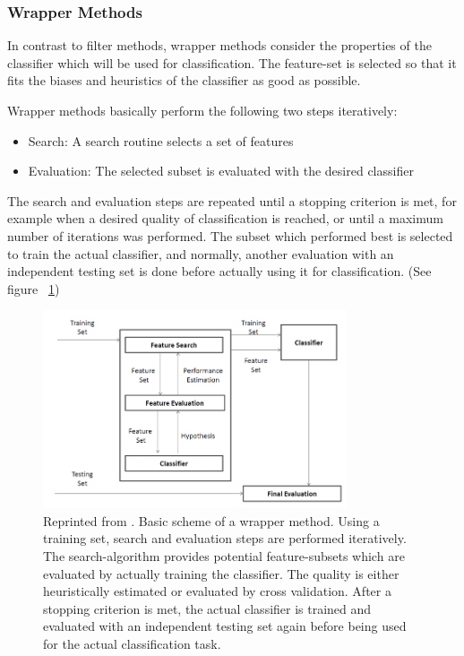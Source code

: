 \subsubsection{Wrapper Methods}
\label{sec:methods.flat.wrapper}


In contrast to filter methods, wrapper methods consider the properties of the classifier which will be used for classification.
The feature-set is selected so that it fits the biases and heuristics of the classifier as good as possible. 

Wrapper methods basically perform the following two steps iteratively: 

\begin{itemize}
  \item Search: A search routine selects a set of features 
  \item Evaluation: The selected subset is evaluated with the desired classifier
\end{itemize}

The search and evaluation steps are repeated until a stopping criterion is met, for example when a desired quality of classification is reached, 
or until a maximum number of iterations was performed. The subset which performed best is selected to train the actual classifier,
and normally, another evaluation with an independent testing set is done before actually using it for classification.
(See figure ~\ref{fig:methods.flat.wrapper.diagramm}) 

\begin{figure}[!ht]
  \centering 
  \includegraphics[width=0.8\textwidth]{chapters/methods/flat/wrapper_diagramm}
  \caption{Reprinted from \cite{Tang:04}. Basic scheme of a wrapper method. Using a training set, search and evaluation steps are performed iteratively.
	The search-algorithm provides potential feature-subsets which are evaluated by actually training the classifier. The quality is either heuristically estimated
	or evaluated by cross validation. After a stopping criterion is met, the actual classifier is trained and evaluated with an independent testing set again before
	being used for the actual classification task.}
  \label{fig:methods.flat.wrapper.diagramm}
\end{figure}

